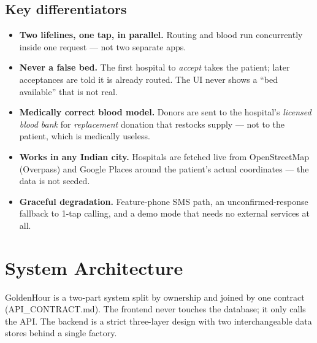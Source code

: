\documentclass[11pt]{article}
\newcommand{\code}[1]{\colorbox{ghCodeBg}{\ttfamily\small #1}}
\begin{document}
\subsection{Key differentiators}
\begin{itemize}
  \item \textbf{Two lifelines, one tap, in parallel.} Routing and blood run concurrently inside one request --- not two separate apps.
  \item \textbf{Never a false bed.} The first hospital to \emph{accept} takes the patient; later acceptances are told it is already routed. The UI never shows a ``bed available'' that is not real.
  \item \textbf{Medically correct blood model.} Donors are sent to the hospital's \emph{licensed blood bank} for \emph{replacement} donation that restocks supply --- not to the patient, which is medically useless.
  \item \textbf{Works in any Indian city.} Hospitals are fetched live from OpenStreetMap (Overpass) and Google Places around the patient's actual coordinates --- the data is not seeded.
  \item \textbf{Graceful degradation.} Feature-phone SMS path, an unconfirmed-response fallback to 1-tap calling, and a demo mode that needs no external services at all.
\end{itemize}

\section{System Architecture}

GoldenHour is a two-part system split by ownership and joined by one contract
(\code{API\_CONTRACT.md}). The frontend never touches the database; it only calls
the API. The backend is a strict three-layer design with two interchangeable data
stores behind a single factory.
\end{document}
